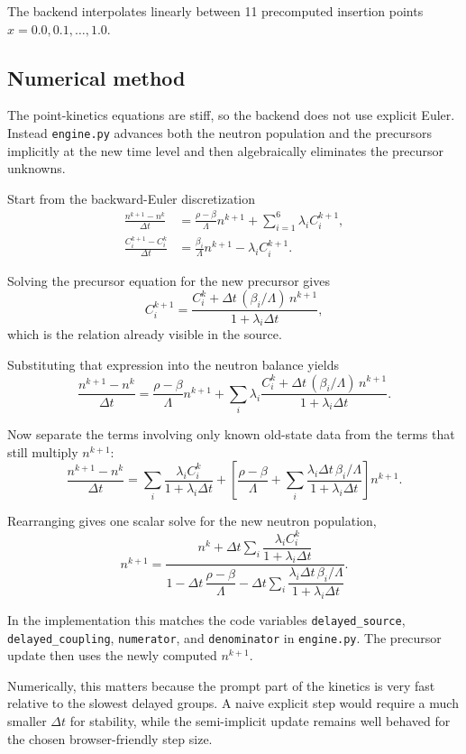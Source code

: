 \documentclass[11pt]{article}
\begin{document}
The backend interpolates linearly between 11 precomputed insertion points
$x = 0.0, 0.1, \dots, 1.0$.

\subsection{Numerical method}

The point-kinetics equations are stiff, so the backend does not use explicit
Euler.  Instead \texttt{engine.py} advances both the neutron population and the
precursors implicitly at the new time level and then algebraically eliminates
the precursor unknowns.

Start from the backward-Euler discretization
\begin{align}
\frac{n^{k+1} - n^k}{\Delta t}
&=
\frac{\rho-\beta}{\Lambda} n^{k+1}
+ \sum_{i=1}^6 \lambda_i C_i^{k+1},
\\
\frac{C_i^{k+1} - C_i^k}{\Delta t}
&=
\frac{\beta_i}{\Lambda} n^{k+1} - \lambda_i C_i^{k+1}.
\end{align}

Solving the precursor equation for the new precursor gives
\[
C_i^{k+1}
=
\frac{C_i^k + \Delta t\,(\beta_i/\Lambda)\,n^{k+1}}
{1 + \lambda_i \Delta t},
\]
which is the relation already visible in the source.

Substituting that expression into the neutron balance yields
\[
\frac{n^{k+1} - n^k}{\Delta t}
=
\frac{\rho-\beta}{\Lambda} n^{k+1}
+ \sum_i \lambda_i
\frac{C_i^k + \Delta t\,(\beta_i/\Lambda)\,n^{k+1}}
{1+\lambda_i\Delta t}.
\]

Now separate the terms involving only known old-state data from the terms that
still multiply $n^{k+1}$:
\[
\frac{n^{k+1} - n^k}{\Delta t}
=
\sum_i \frac{\lambda_i C_i^k}{1+\lambda_i\Delta t}
+
\left[
\frac{\rho-\beta}{\Lambda}
+ \sum_i \frac{\lambda_i \Delta t\,\beta_i/\Lambda}{1+\lambda_i\Delta t}
\right] n^{k+1}.
\]

Rearranging gives one scalar solve for the new neutron population,
\[
n^{k+1}
=
\frac{n^k + \Delta t\sum_i \dfrac{\lambda_i C_i^k}{1+\lambda_i\Delta t}}
{1 - \Delta t\,\dfrac{\rho-\beta}{\Lambda}
 - \Delta t\sum_i
   \dfrac{\lambda_i \Delta t\,\beta_i/\Lambda}{1+\lambda_i\Delta t}}.
\]

In the implementation this matches the code variables
\texttt{delayed\_source}, \texttt{delayed\_coupling}, \texttt{numerator}, and
\texttt{denominator} in \texttt{engine.py}.  The precursor update then uses the
newly computed $n^{k+1}$.

Numerically, this matters because the prompt part of the kinetics is very fast
relative to the slowest delayed groups.  A naive explicit step would require a
much smaller $\Delta t$ for stability, while the semi-implicit update remains
well behaved for the chosen browser-friendly step size.
\end{document}
